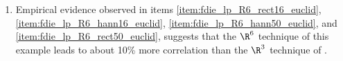 \begin{example}
\begin{enumerate}
  \item Empirical evidence observed in items
                    \ref{item:fdie_lp_R6_rect16_euclid},
                    \ref{item:fdie_lp_R6_hann16_euclid},  
                    \ref{item:fdie_lp_R6_hann50_euclid}, and
                    \ref{item:fdie_lp_R6_rect50_euclid},
        suggests that the $\R^6$ technique of this example leads to about 10\% more correlation 
        than the $\R^3$ technique of .
\end{enumerate}
\end{example}





